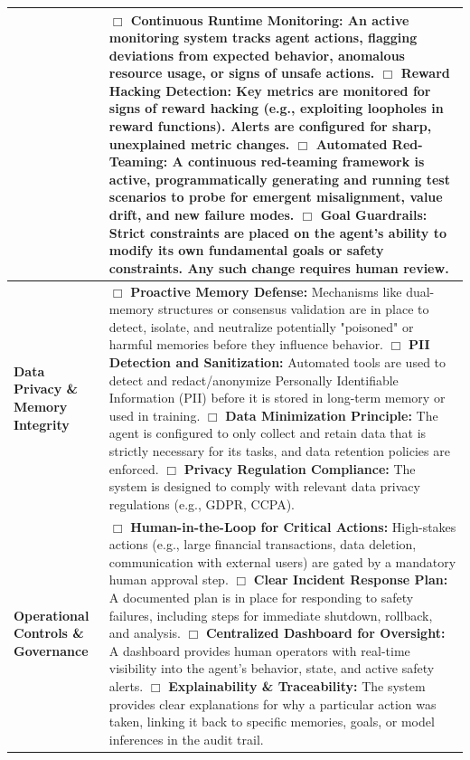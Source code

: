 \begin{table}[h!]
\begin{tabularx}{\textwidth}{|>{\raggedright\arraybackslash}p{3cm}|X|}
    & $\Box$ \textbf{Continuous Runtime Monitoring:} An active monitoring system tracks agent actions, flagging deviations from expected behavior, anomalous resource usage, or signs of unsafe actions. \newline
    $\Box$ \textbf{Reward Hacking Detection:} Key metrics are monitored for signs of reward hacking (e.g., exploiting loopholes in reward functions). Alerts are configured for sharp, unexplained metric changes. \newline
    $\Box$ \textbf{Automated Red-Teaming:} A continuous red-teaming framework is active, programmatically generating and running test scenarios to probe for emergent misalignment, value drift, and new failure modes. \newline
    $\Box$ \textbf{Goal Guardrails:} Strict constraints are placed on the agent's ability to modify its own fundamental goals or safety constraints. Any such change requires human review. \\ \hline
\textbf{Data Privacy \& Memory Integrity}
    & $\Box$ \textbf{Proactive Memory Defense:} Mechanisms like dual-memory structures or consensus validation are in place to detect, isolate, and neutralize potentially "poisoned" or harmful memories before they influence behavior. \newline
    $\Box$ \textbf{PII Detection and Sanitization:} Automated tools are used to detect and redact/anonymize Personally Identifiable Information (PII) before it is stored in long-term memory or used in training. \newline
    $\Box$ \textbf{Data Minimization Principle:} The agent is configured to only collect and retain data that is strictly necessary for its tasks, and data retention policies are enforced. \newline
    $\Box$ \textbf{Privacy Regulation Compliance:} The system is designed to comply with relevant data privacy regulations (e.g., GDPR, CCPA). \\ \hline
\textbf{Operational Controls \& Governance}
    & $\Box$ \textbf{Human-in-the-Loop for Critical Actions:} High-stakes actions (e.g., large financial transactions, data deletion, communication with external users) are gated by a mandatory human approval step. \newline
    $\Box$ \textbf{Clear Incident Response Plan:} A documented plan is in place for responding to safety failures, including steps for immediate shutdown, rollback, and analysis. \newline
    $\Box$ \textbf{Centralized Dashboard for Oversight:} A dashboard provides human operators with real-time visibility into the agent's behavior, state, and active safety alerts. \newline
    $\Box$ \textbf{Explainability \& Traceability:} The system provides clear explanations for why a particular action was taken, linking it back to specific memories, goals, or model inferences in the audit trail. \\ \hline
\end{tabularx}
\end{table}




